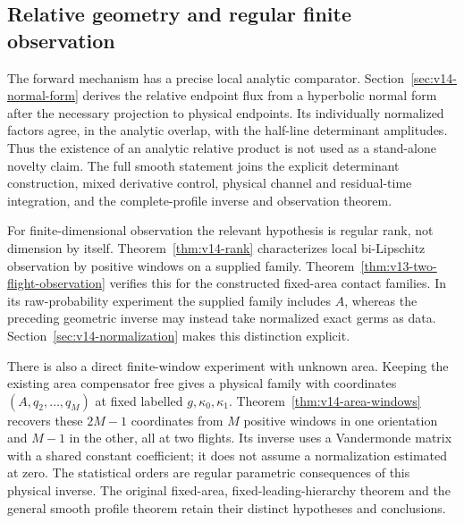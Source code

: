 \subsection{Relative geometry and regular finite observation}
The forward mechanism has a precise local analytic comparator.
Section~\ref{sec:v14-normal-form} derives the relative endpoint flux
from a hyperbolic normal form after the necessary projection to
physical endpoints. Its individually normalized factors agree, in
the analytic overlap, with the half-line determinant amplitudes.
Thus the existence of an analytic relative product is not used as a
stand-alone novelty claim. The full smooth statement joins the
explicit determinant construction, mixed derivative control, physical
channel and residual-time integration, and the complete-profile
inverse and observation theorem.

For finite-dimensional observation the relevant hypothesis is regular
rank, not dimension by itself. Theorem~\ref{thm:v14-rank} characterizes
local bi-Lipschitz observation by positive windows on a supplied
family. Theorem~\ref{thm:v13-two-flight-observation} verifies this for
the constructed fixed-area contact families. In its raw-probability
experiment the supplied family includes $A$, whereas the preceding
geometric inverse may instead take normalized exact germs as data.
Section~\ref{sec:v14-normalization} makes this distinction explicit.

There is also a direct finite-window experiment with unknown area.
Keeping the existing area compensator free gives a physical family
with coordinates $(A,q_2,\ldots,q_M)$ at fixed labelled
$g,\kappa_0,\kappa_1$. Theorem~\ref{thm:v14-area-windows} recovers
these $2M-1$ coordinates from $M$ positive windows in one orientation
and $M-1$ in the other, all at two flights. Its inverse uses a
Vandermonde matrix with a shared constant coefficient; it does not
assume a normalization estimated at zero. The statistical orders are
regular parametric consequences of this physical inverse. The original
fixed-area, fixed-leading-hierarchy theorem and the general smooth
profile theorem retain their distinct hypotheses and conclusions.
